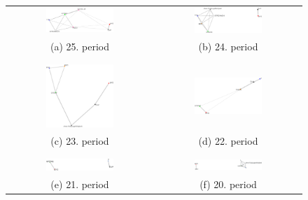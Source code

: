 \begin{figure}[h!]
	\center
	\setlength{\tabcolsep}{.26667em}
	\begin{tabular}{ c | c }
		\includegraphics[width=0.48\textwidth]{imgs/graphs/club-graphs/horizontal/graph_25.eps}
		&
		\includegraphics[width=0.48\textwidth]{imgs/graphs/club-graphs/horizontal/graph_24.eps}
		\\
		(a) 25. period
		&
		(b) 24. period
		
		\\
		\\
		\hline
		\\
		\includegraphics[width=0.48\textwidth]{imgs/graphs/club-graphs/horizontal/graph_23.eps}
		&
		\includegraphics[width=0.48\textwidth]{imgs/graphs/club-graphs/horizontal/graph_22.eps}
		\\
		(c) 23. period
		&
		(d) 22. period
		\\
		\\
		\hline
		\\
		\includegraphics[width=0.48\textwidth]{imgs/graphs/club-graphs/horizontal/graph_21.eps}
		&
		\includegraphics[width=0.48\textwidth]{imgs/graphs/club-graphs/horizontal/graph_20.eps}
		\\
		(e) 21. period
		&
		(f) 20. period	
		

\end{tabular}
\end{figure}

